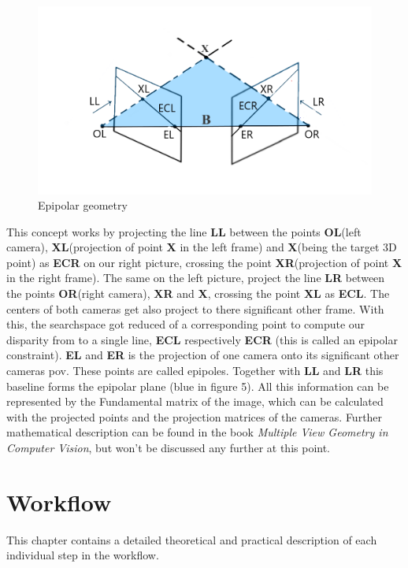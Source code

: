\documentclass[journal,onecolumn]{IEEEtran}
\begin{document}
\begin{figure}[H]
	\centering
	\includegraphics[scale=0.5]{epipolarGeometry.png}
	\captionsetup{justification=centering}
	\caption{Epipolar geometry}
\end{figure}
\noindent
This concept works by projecting the line {\bf LL} between the points {\bf OL}(left camera), {\bf XL}(projection of point {\bf X} in the left frame) and {\bf X}(being the target 3D point) as {\bf ECR} on our right picture, crossing the point {\bf XR}(projection of point {\bf X} in the right frame). The same on the left picture, project the line {\bf LR} between the points {\bf OR}(right camera), {\bf XR} and {\bf X}, crossing the point {\bf XL} as {\bf ECL}. The centers of both cameras get also project to there significant other frame.
With this, the searchspace got reduced of a corresponding point to compute our disparity from to a single line, {\bf ECL} respectively {\bf ECR} (this is called an epipolar constraint). {\bf EL} and {\bf ER} is the projection of one camera onto its significant other cameras pov. These points are called epipoles. Together with {\bf LL} and {\bf LR} this baseline forms the epipolar plane (blue in figure 5). All this information can be represented by the Fundamental matrix of the image, which can be calculated with the projected points and the projection matrices of the cameras. Further mathematical description can be found in the book \emph{Multiple View Geometry in Computer Vision}\cite{hartley_zisserman_2004}, but won't be discussed any further at this point.

\section{Workflow}
\noindent
This chapter contains a detailed theoretical and practical description of each individual step in the workflow.
\end{document}
